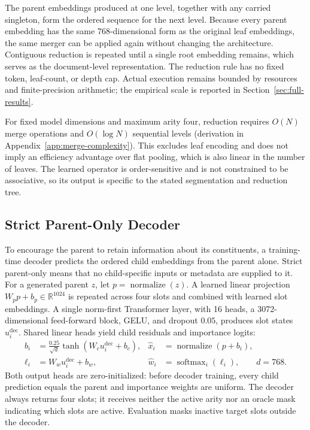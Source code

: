 \documentclass[10pt]{article}
\begin{document}
The parent embeddings produced at one level, together with any carried singleton, form the ordered sequence for the next level. Because every parent embedding has the same 768-dimensional form as the original leaf embeddings, the same merger can be applied again without changing the architecture. Contiguous reduction is repeated until a single root embedding remains, which serves as the document-level representation. The reduction rule has no fixed token, leaf-count, or depth cap. Actual
execution remains bounded by resources and finite-precision arithmetic; the
empirical scale is reported in Section~\ref{sec:full-results}.

For fixed model dimensions and maximum arity four, reduction requires
\(O(N)\) merge operations and \(O(\log N)\) sequential levels
(derivation in Appendix~\ref{app:merge-complexity}). This excludes leaf
encoding and does not imply an efficiency advantage over
flat pooling, which is also linear in the number of leaves. The learned
operator is order-sensitive and is not constrained to be associative, so its
output is specific to the stated segmentation and reduction tree.

\subsection{Strict Parent-Only Decoder}
\label{sec:strict-decoder}

To encourage the parent to retain information about its constituents, a
training-time decoder predicts the ordered child embeddings from the parent
alone. Strict parent-only means that no child-specific inputs or metadata
are supplied to it. For a generated parent \(z\), let
\(p=\operatorname{normalize}(z)\). A learned linear projection
\(W_p p+b_p\in\mathbb{R}^{1024}\) is repeated across four slots and combined
with learned slot embeddings. A single norm-first Transformer layer, with
16 heads, a 3072-dimensional feed-forward block, GELU, and dropout \(0.05\),
produces slot states \(u_i^{\mathrm{dec}}\). Shared linear heads yield child
residuals and importance logits:
\begin{align}
 b_i &= \frac{0.25}{\sqrt d}\tanh\!\left(W_c u_i^{\mathrm{dec}}+b_c\right),
 & \hat{x}_i &= \operatorname{normalize}(p+b_i),\label{eq:strict-decoder}\\
 \ell_i &= W_w u_i^{\mathrm{dec}}+b_w,
 & \hat{w}_i &= \operatorname{softmax}_i(\ell_i),\qquad d=768.
\end{align}
Both output heads are zero-initialized: before decoder training, every child
prediction equals the parent and importance weights are uniform. The decoder
always returns four slots; it receives neither the active arity nor an
oracle mask indicating which slots are active. Evaluation masks inactive target slots outside the decoder.
\end{document}
